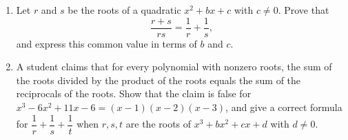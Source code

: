 \begin{enumerate}
\item[(a)] Let $r$ and $s$ be the roots of a quadratic $x^2+bx+c$ with $c\ne0$. Prove that
\[\dfrac{r+s}{rs}=\dfrac1r+\dfrac1s,\]
and express this common value in terms of $b$ and $c$.
\item[(b)] A student claims that for every polynomial with nonzero roots, the sum of the roots divided by the product of the roots equals the sum of the reciprocals of the roots. Show that the claim is false for $x^3-6x^2+11x-6=(x-1)(x-2)(x-3)$, and give a correct formula for $\dfrac1r+\dfrac1s+\dfrac1t$ when $r,s,t$ are the roots of $x^3+bx^2+cx+d$ with $d\ne0$.
\end{enumerate}
